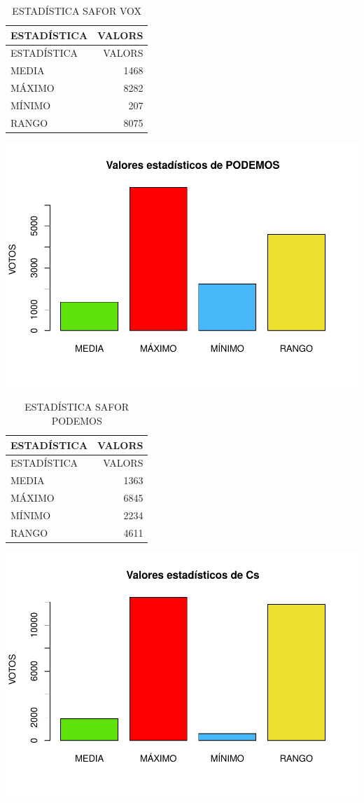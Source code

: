 \documentclass[
]{article}
\begin{document}
\begin{longtable}[]{@{}lr@{}}
\caption{ESTADÍSTICA SAFOR VOX}\tabularnewline
\toprule\noalign{}
ESTADÍSTICA & VALORS \\
\midrule\noalign{}
\endfirsthead
\toprule\noalign{}
ESTADÍSTICA & VALORS \\
\midrule\noalign{}
\endhead
\bottomrule\noalign{}
\endlastfoot
MEDIA & 1468 \\
MÁXIMO & 8282 \\
MÍNIMO & 207 \\
RANGO & 8075 \\
\end{longtable}

\includegraphics{SAFOR_files/figure-latex/6-5.pdf}

\begin{longtable}[]{@{}lr@{}}
\caption{ESTADÍSTICA SAFOR PODEMOS}\tabularnewline
\toprule\noalign{}
ESTADÍSTICA & VALORS \\
\midrule\noalign{}
\endfirsthead
\toprule\noalign{}
ESTADÍSTICA & VALORS \\
\midrule\noalign{}
\endhead
\bottomrule\noalign{}
\endlastfoot
MEDIA & 1363 \\
MÁXIMO & 6845 \\
MÍNIMO & 2234 \\
RANGO & 4611 \\
\end{longtable}

\includegraphics{SAFOR_files/figure-latex/6-6.pdf}
\end{document}
